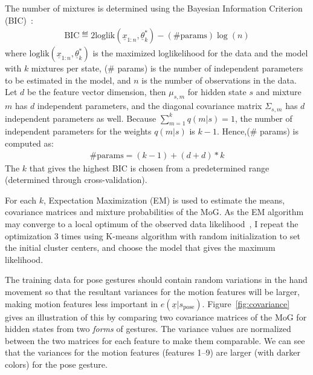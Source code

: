The number of mixtures is
determined using the Bayesian Information Criterion (BIC)~\cite{fraley06}:
\begin{align*}
\text{BIC}\eqdef2\text{loglik}(\underline{x}_{1:n}, \underline{\theta}_k^*) -
(\text{\# params})\log(n)
\end{align*}
where $\text{loglik}(\underline{x}_{1:n}, \underline{\theta}_k^*)$ is the
maximized loglikelihood for the data and the model with $k$ mixtures per state, (\# params) is the number of independent parameters to be estimated in the model, and $n$ is the number of observations in
the data. Let $d$ be the feature vector dimension, then $\mu_{s,m}$ for
hidden state $s$ and mixture $m$ has $d$ independent parameters, and the
diagonal covariance matrix $\Sigma_{s,m}$ has $d$ independent parameters as
well. Because $\sum_{m=1}^k q(m | s) = 1$, the number of independent parameters
for the weights $q(m|s)$ is $k - 1$. Hence,(\# params) is computed as:
\begin{align*}
\text{\# params} = (k - 1) + (d + d) * k
\end{align*}
The $k$ that gives the highest BIC is chosen from a predetermined range
(determined through cross-validation).

For each $k$, Expectation Maximization (EM) is used to estimate the means,
covariance matrices and mixture probabilities of the MoG. As the EM algorithm may
converge to a local optimum of the observed data likelihood~\cite{dicintio12}, I
repeat the optimization 3 times using K-means algorithm with random
initialization to set the initial cluster centers, and choose the model that
gives the maximum likelihood.

The training data for pose gestures should contain random variations in the
hand movement so that the resultant variances for the motion features will be
larger, making motion features less important in
$e(\underline{x}|s_{\text{pose}})$. Figure~\ref{fig:covariance} gives an
illustration of this by comparing two covariance matrices of the MoG for hidden
states from two \textit{forms} of gestures.
The variance values are normalized between the two matrices for each feature to make
them comparable. We can see that the variances for the motion features (features
1--9) are larger (with darker colors) for the pose gesture.

